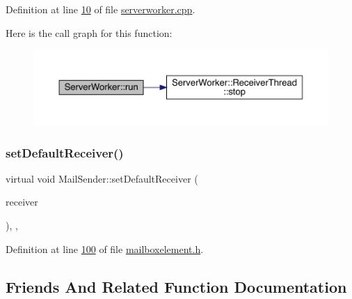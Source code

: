 Definition at line \hyperlink{a00107_source_l00010}{10} of file \hyperlink{a00107_source}{serverworker.\+cpp}.

Here is the call graph for this function\+:
\nopagebreak
\begin{figure}[H]
\begin{center}
\leavevmode
\includegraphics[width=350pt]{de/df3/a00185_a8b4f9a11d13f0b4990ae72f87da010df_cgraph}
\end{center}
\end{figure}
\mbox{\label{a00205_aa85db0004c26606c5ac294e5de000b96}} 
\subsubsection{\texorpdfstring{set\+Default\+Receiver()}{setDefaultReceiver()}}
{\footnotesize\ttfamily virtual void Mail\+Sender\+::set\+Default\+Receiver (\begin{DoxyParamCaption}\item[{\hyperlink{a00197}{Mail\+Receiver} $\ast$}]{receiver }\end{DoxyParamCaption})\hspace{0.3cm}{\ttfamily [inline]}, {\ttfamily [virtual]}, {\ttfamily [inherited]}}



Definition at line \hyperlink{a00002_source_l00100}{100} of file \hyperlink{a00002_source}{mailboxelement.\+h}.



\subsection{Friends And Related Function Documentation}
\mbox{\label{a00185_a767ca3da04cac0be47d1ee1da9eea938}} 
